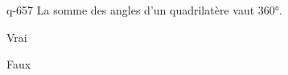 \begin{truefalse}{q-657}
La somme des angles d'un quadrilatère vaut $360$°.
\item Vrai
\item* Faux
\end{truefalse}

